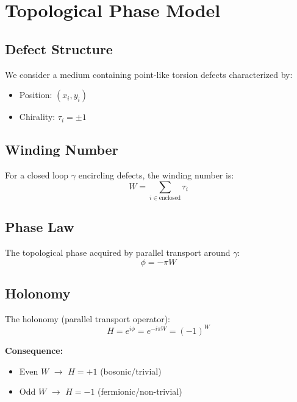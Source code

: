 \documentclass[11pt,a4paper]{article}
\begin{document}
\section{Topological Phase Model}

\subsection{Defect Structure}

We consider a medium containing point-like torsion defects characterized by:
\begin{itemize}
    \item Position: $(x_i, y_i)$
    \item Chirality: $\tau_i = \pm 1$
\end{itemize}

\subsection{Winding Number}

For a closed loop $\gamma$ encircling defects, the winding number is:
\begin{equation}
W = \sum_{i \in \text{enclosed}} \tau_i
\end{equation}

\subsection{Phase Law}

The topological phase acquired by parallel transport around $\gamma$:
\begin{equation}
\boxed{\phi = -\pi W}
\end{equation}

\subsection{Holonomy}

The holonomy (parallel transport operator):
\begin{equation}
H = e^{i\phi} = e^{-i\pi W} = (-1)^W
\end{equation}

\textbf{Consequence:}
\begin{itemize}
    \item Even $W$ $\rightarrow$ $H = +1$ (bosonic/trivial)
    \item Odd $W$ $\rightarrow$ $H = -1$ (fermionic/non-trivial)
\end{itemize}
\end{document}
